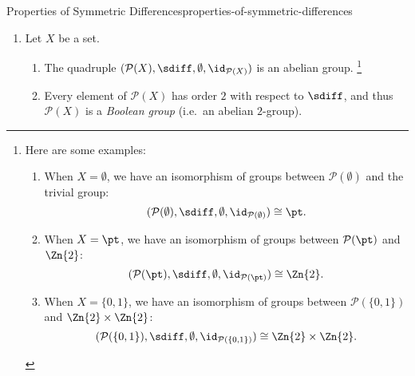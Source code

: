 \begin{proposition}{Properties of Symmetric Differences}{properties-of-symmetric-differences}
\begin{enumerate}
        \item\label{properties-of-symmetric-differences-interaction-with-powersets-and-groups}Let $X$ be a set.
            \begin{enumerate}
                \item\label{properties-of-symmetric-differences-interaction-with-powersets-and-groups-a}The quadruple $(\mathcal{P}(X),\sdiff,\emptyset,\id_{\mathcal{P}(X)})$ is an abelian group.%
                    \footnote{%
                        Here are some examples:
                        \begin{enumerate}
                            \item\label{proof-of-properties-of-symmetric-differences-interaction-with-powersets-and-groups-a-1}When $X=\emptyset$, we have an isomorphism of groups between $\mathcal{P}(\emptyset)$ and the trivial group:
                                \[
                                    (\mathcal{P}(\emptyset),\sdiff,\emptyset,\id_{\mathcal{P}(\emptyset)})
                                    \cong
                                    \pt.
                                \]%
                            \item\label{proof-of-properties-of-symmetric-differences-interaction-with-powersets-and-groups-a-2}When $X=\pt$, we have an isomorphism of groups between $\mathcal{P}(\pt)$ and $\Zn{2}$:
                                \[
                                    (\mathcal{P}(\pt),\sdiff,\emptyset,\id_{\mathcal{P}(\pt)})
                                    \cong
                                    \Zn{2}.
                                \]%
                            \item\label{proof-of-properties-of-symmetric-differences-interaction-with-powersets-and-groups-a-3}When $X=\{0,1\}$, we have an isomorphism of groups between $\mathcal{P}(\{0,1\})$ and $\Zn{2}\times\Zn{2}$:
                                \[
                                    (\mathcal{P}(\{0,1\}),\sdiff,\emptyset,\id_{\mathcal{P}(\{0,1\})})
                                    \cong
                                    \Zn{2}\times\Zn{2}.
                                \]%
                        \end{enumerate}
                        \par\vspace*{\TCBBoxCorrection}
                    }%
                \item\label{properties-of-symmetric-differences-interaction-with-powersets-and-groups-b}Every element of $\mathcal{P}(X)$ has order $2$ with respect to $\sdiff$, and thus $\mathcal{P}(X)$ is a \emph{Boolean group} (i.e.\ an abelian $2$-group).

\end{enumerate}
\end{enumerate}
\end{proposition}
